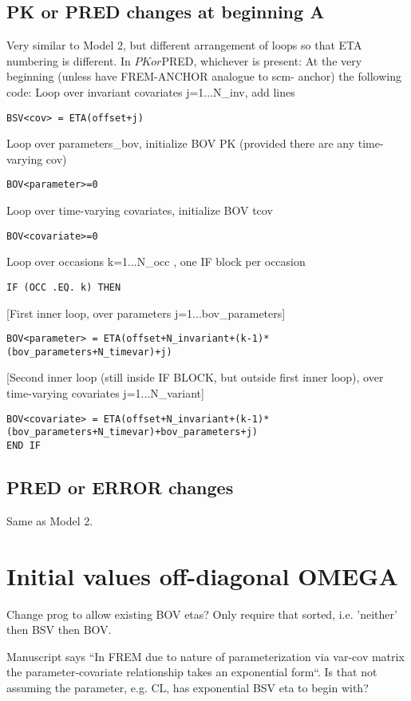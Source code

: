 \subsection{PK or PRED changes at beginning A}
Very similar to Model 2, but different arrangement of loops so that ETA numbering is different.
In $PK or $PRED, whichever is present:
At the very beginning (unless have FREM-ANCHOR analogue to scm- anchor) the following code:
Loop over invariant covariates j=1...N\_inv, add lines
\begin{verbatim}
BSV<cov> = ETA(offset+j)
\end{verbatim}
Loop over parameters\_bov, initialize BOV PK (provided there are any time-varying cov)
\begin{verbatim}
BOV<parameter>=0
\end{verbatim}
Loop over time-varying covariates, initialize BOV tcov
\begin{verbatim}
BOV<covariate>=0
\end{verbatim}
Loop over occasions k=1...N\_occ , one IF block per occasion
\begin{verbatim}
IF (OCC .EQ. k) THEN
\end{verbatim}
[First inner loop, over parameters j=1...bov\_parameters]
\begin{verbatim}
BOV<parameter> = ETA(offset+N_invariant+(k-1)*(bov_parameters+N_timevar)+j)
\end{verbatim}
[Second inner loop (still inside IF BLOCK, but outside first inner loop), over time-varying covariates j=1...N\_variant]
\begin{verbatim}
BOV<covariate> = ETA(offset+N_invariant+(k-1)*(bov_parameters+N_timevar)+bov_parameters+j)
END IF
\end{verbatim}

\subsection{PRED or ERROR changes}
Same as Model 2.

\section{Initial values off-diagonal OMEGA}

Change prog to allow existing BOV etas? Only require that sorted, i.e. 'neither' then BSV then BOV.


Manuscript says ``In FREM due to nature of parameterization via var-cov matrix the parameter-covariate
relationship
takes an exponential form``. Is that not assuming the parameter, e.g. CL, has exponential BSV eta to begin with?

